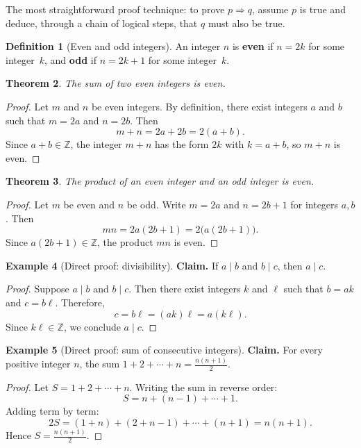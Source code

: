 \documentclass[12pt,a4paper,openany]{book}
\theoremstyle{definition}
\newtheorem{definition}{Definition}[chapter]
\newtheorem{example}[definition]{Example}
\theoremstyle{plain}
\newtheorem{theorem}[definition]{Theorem}
\theoremstyle{remark}
\newcommand{\Z}{\mathbb{Z}}
\begin{document}
The most straightforward proof technique: to prove $p \Rightarrow q$, assume $p$ is
true and deduce, through a chain of logical steps, that $q$ must also be true.

\begin{definition}[Even and odd integers]
\label{def:even-odd}
An integer $n$ is \textbf{even} if $n = 2k$ for some integer~$k$,
and \textbf{odd} if $n = 2k + 1$ for some integer~$k$.
\end{definition}

\begin{theorem}
\label{thm:sum-even}
The sum of two even integers is even.
\end{theorem}

\begin{proof}
Let $m$ and $n$ be even integers. By definition, there exist integers $a$ and $b$
such that $m = 2a$ and $n = 2b$. Then
\[
  m + n = 2a + 2b = 2(a + b).
\]
Since $a + b \in \Z$, the integer $m + n$ has the form $2k$ with $k = a + b$,
so $m + n$ is even.
\end{proof}

\begin{theorem}
\label{thm:product-even-odd}
The product of an even integer and an odd integer is even.
\end{theorem}

\begin{proof}
Let $m$ be even and $n$ be odd. Write $m = 2a$ and $n = 2b + 1$ for integers $a, b$.
Then
\[
  mn = 2a(2b + 1) = 2\bigl(a(2b+1)\bigr).
\]
Since $a(2b+1) \in \Z$, the product $mn$ is even.
\end{proof}

\begin{example}[Direct proof: divisibility]
\label{ex:direct-divisibility}
\textbf{Claim.} If $a \mid b$ and $b \mid c$, then $a \mid c$.

\begin{proof}
Suppose $a \mid b$ and $b \mid c$. Then there exist integers $k$ and $\ell$ such that
$b = ak$ and $c = b\ell$. Therefore,
\[
  c = b\ell = (ak)\ell = a(k\ell).
\]
Since $k\ell \in \Z$, we conclude $a \mid c$.
\end{proof}
\end{example}

\begin{example}[Direct proof: sum of consecutive integers]
\label{ex:direct-consecutive}
\textbf{Claim.} For every positive integer $n$, the sum $1 + 2 + \cdots + n = \frac{n(n+1)}{2}$.

\begin{proof}
Let $S = 1 + 2 + \cdots + n$. Writing the sum in reverse order:
\[
  S = n + (n-1) + \cdots + 1.
\]
Adding term by term:
\[
  2S = (1+n) + (2+n-1) + \cdots + (n+1) = n(n+1).
\]
Hence $S = \frac{n(n+1)}{2}$.
\end{proof}
\end{example}
\end{document}
